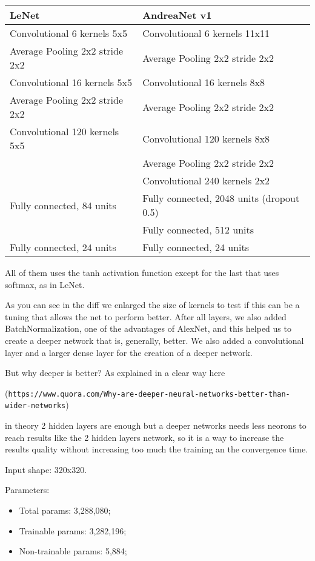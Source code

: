 \documentclass[paper=a4, fontsize=11pt]{scrartcl} %
\numberwithin{equation}{section} %
\numberwithin{figure}{section} %
\numberwithin{table}{section} %
\begin{document}
\bigskip
\begin{tabular}{ | l | l | }
    \hline
    \textbf{LeNet} & \textbf{AndreaNet v1} \\ \hline
    Convolutional 6 kernels 5x5 & Convolutional 6 kernels 11x11 \\ \hline 
    Average Pooling 2x2 stride 2x2 & Average Pooling 2x2 stride 2x2 \\ \hline 
    Convolutional 16 kernels 5x5 & Convolutional 16 kernels 8x8 \\ \hline 
    Average Pooling 2x2 stride 2x2 & Average Pooling 2x2 stride 2x2 \\ \hline
    Convolutional 120 kernels 5x5 & Convolutional 120 kernels 8x8 \\ \hline
    & Average Pooling 2x2 stride 2x2 \\ \hline     
    & Convolutional 240 kernels 2x2 \\ \hline 
    Fully connected, 84 units & Fully connected, 2048 units (dropout 0.5) \\ \hline 
    & Fully connected, 512 units \\ \hline 
    Fully connected, 24 units & Fully connected, 24 units \\ \hline 
\end{tabular}
\bigskip

All of them uses the tanh activation function except for the last that uses softmax, as in LeNet.

As you can see in the diff we enlarged the size of kernels to test if this can be a tuning that allows the net to perform better.
After all layers, we also added BatchNormalization, one of the advantages of AlexNet, and this helped us to create a deeper network that is, generally, better.
We also added a convolutional layer and a larger dense layer for the creation of a deeper network.

But why deeper is better? As explained in a clear way here

(\verb|https://www.quora.com/Why-are-deeper-neural-networks-better-than-wider-networks|)

in theory 2 hidden layers are enough but a deeper networks needs less neorons to reach results like the 2 hidden layers network, so it is a way to increase the results quality without increasing too much the training an the convergence time.

\bigskip
Input shape: 320x320.

Parameters:
\begin{itemize}
    \item Total params: 3,288,080;
    \item Trainable params: 3,282,196;
    \item Non-trainable params: 5,884;
\end{itemize}
\end{document}
